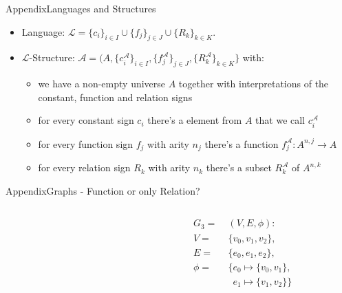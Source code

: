 \begin{frame}[allowframebreaks]{Appendix}{Languages and Structures}
  \begin{itemize}
    \item \alert{Language:} ${\mathcal{L}}=\{c_{i}\}_{i\in I}\cup\{f_{j}\}_{j\in J}\cup\{R_{k}\}_{k\in K}.$
    \item \alert{$\mathcal{L}$-Structure:} $\mathcal{A}=(A,\{c_{i}^{\mathcal{A}}\}_{i\in I},\{f_{j}^{\mathcal{A}}\}_{j\in J},\{R_{k}^{\mathcal{A}}\}_{k\in K}\}$ with:
    \begin{itemize}
      \item we have a non-empty \alert{universe} $A$ together with interpretations of the \alert{constant}, \alert{function} and \alert{relation} signs
      \item for every \alert{constant sign} $c_i$ there's a element from $A$ that we call $c_i^{\mathcal{A}}$
      \item for every \alert{function sign} $f_j$ with arity $n_j$ there's a function $f_j^{\mathcal{A}}: A^{n, j} \rightarrow A$
      \item for every \alert{relation sign} $R_k$ with arity $n_k$ there's a subset $R_k^{\mathcal{A}}$ of $A^{n, k}$
    \end{itemize}
  \end{itemize}
\end{frame}

\begin{frame}[allowframebreaks]{Appendix}{Graphs - Function or only Relation?}
  \begin{columns}
    \begin{column}{0.6\textwidth}
    \end{column}
    \begin{column}{0.4\textwidth}
      \begin{align*}
        G_3 =\;&\left(V,E,\phi\right):\\
        V =\;&\{v_0, v_1, v_2\}, \\
        E =\;&\{e_0, e_1, e_{2} \}, \\
        \phi = &\{e_0 \mapsto \{v_0, v_1\},\\ 
               &\enspace e_1 \mapsto  \{v_1, v_2\}\} 
      \end{align*}
    \end{column}
  \end{columns}
\end{frame}
